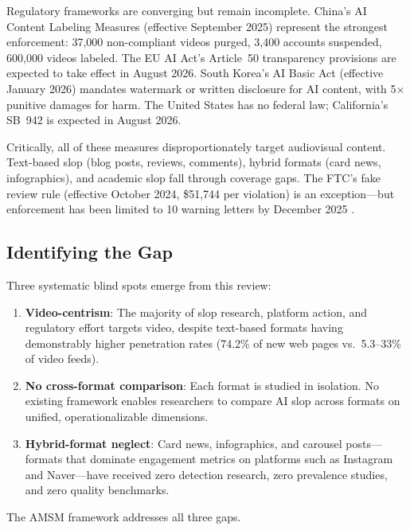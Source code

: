 \documentclass[12pt,a4paper]{article}
\begin{document}
Regulatory frameworks are converging but remain incomplete. China's AI Content Labeling Measures (effective September 2025) represent the strongest enforcement: 37,000 non-compliant videos purged, 3,400 accounts suspended, 600,000 videos labeled. The EU AI Act's Article~50 transparency provisions are expected to take effect in August 2026. South Korea's AI Basic Act (effective January 2026) mandates watermark or written disclosure for AI content, with 5$\times$ punitive damages for harm. The United States has no federal law; California's SB~942 is expected in August 2026.

Critically, all of these measures disproportionately target audiovisual content. Text-based slop (blog posts, reviews, comments), hybrid formats (card news, infographics), and academic slop fall through coverage gaps. The FTC's fake review rule (effective October 2024, \$51,744 per violation) is an exception---but enforcement has been limited to 10 warning letters by December 2025 \parencite{FTC2024}.

\subsection{Identifying the Gap}

Three systematic blind spots emerge from this review:

\begin{enumerate}[leftmargin=*]
  \item \textbf{Video-centrism}: The majority of slop research, platform action, and regulatory effort targets video, despite text-based formats having demonstrably higher penetration rates (74.2\% of new web pages vs.\ 5.3--33\% of video feeds).

  \item \textbf{No cross-format comparison}: Each format is studied in isolation. No existing framework enables researchers to compare AI slop across formats on unified, operationalizable dimensions.

  \item \textbf{Hybrid-format neglect}: Card news, infographics, and carousel posts---formats that dominate engagement metrics on platforms such as Instagram and Naver---have received zero detection research, zero prevalence studies, and zero quality benchmarks.
\end{enumerate}

The AMSM framework addresses all three gaps.


\end{document}
